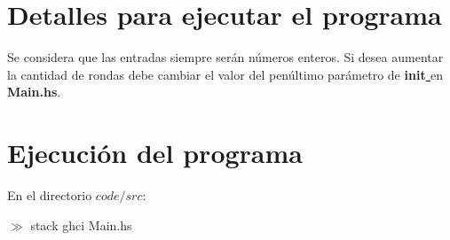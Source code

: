 \documentclass{book}
\begin{document}
	\section{Detalles para ejecutar el programa}
		Se considera que las entradas siempre ser\'an n\'umeros enteros. Si desea aumentar la cantidad de rondas debe cambiar el valor del pen\'ultimo par\'ametro de \textbf{init\underline{  }} en \textbf{Main.hs}.
	
	\section{Ejecuci\'on del programa}
	
		En el directorio $code/src$:
		\begin{center}
			$\gg$ stack ghci Main.hs
		\end{center}
		 
	
	
\end{document}
